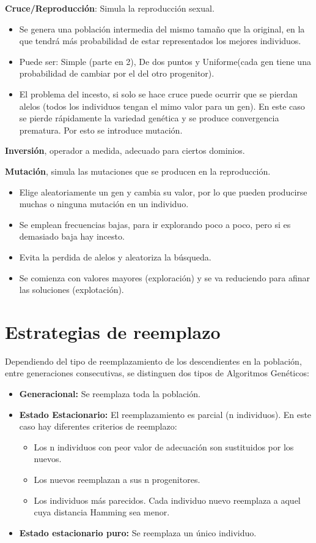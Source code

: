 \documentclass[12pt, twoside, openright]{report} %
\begin{document}
\textbf{Cruce/Reproducción}: Simula la reproducción sexual.
\begin{itemize}
	\item Se genera una población intermedia del mismo tamaño que la original, en la que tendrá más probabilidad de estar representados los mejores individuos.
	\item Puede ser: Simple (parte en 2), De dos puntos y Uniforme(cada gen tiene una probabilidad de cambiar por el del otro progenitor).
	\item El problema del incesto, si solo se hace cruce puede ocurrir que se pierdan alelos (todos los individuos tengan el mimo valor para un gen). En este caso se pierde rápidamente la variedad genética y se produce convergencia prematura. Por esto se introduce mutación.
\end{itemize}

\textbf{Inversión}, operador a medida, adecuado para ciertos dominios.

\textbf{Mutación}, simula las mutaciones que se producen en la reproducción.
\begin{itemize}
	\item  Elige aleatoriamente un gen y cambia su valor, por lo que pueden producirse muchas o ninguna mutación en un individuo.
	\item Se emplean frecuencias bajas, para ir explorando poco a poco, pero si es demasiado baja hay incesto.
	\item Evita la perdida de alelos y aleatoriza la búsqueda.
	\item Se comienza con valores mayores (exploración) y se va reduciendo para afinar las soluciones (explotación).
\end{itemize}

\section{Estrategias de reemplazo}
Dependiendo del tipo de reemplazamiento de los descendientes en la población, entre generaciones consecutivas, se distinguen dos tipos de Algoritmos Genéticos:
\begin{itemize}
	\item \textbf{Generacional:} Se reemplaza toda la población.
	\item \textbf{Estado Estacionario:} El reemplazamiento es parcial (n individuos). En este caso hay diferentes criterios de reemplazo:
	      \begin{itemize}
		      \item Los n individuos con peor valor de adecuación son sustituidos por los nuevos.
		      \item Los nuevos reemplazan a sus n progenitores.
		      \item Los individuos más parecidos. Cada individuo nuevo reemplaza a aquel cuya distancia Hamming sea menor.
	      \end{itemize}
	\item \textbf{Estado estacionario puro:} Se reemplaza un único individuo.
\end{itemize}
\end{document}
